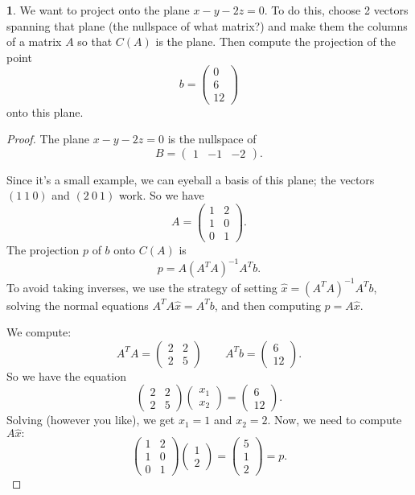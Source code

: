\documentclass{article}
\theoremstyle{definition}
\newtheorem{prob}{}
\begin{document}
\begin{prob}
	We want to project onto the plane $x-y-2z=0$. To do this, choose 2 vectors spanning that plane (the nullspace of what matrix?) and make them the columns of a matrix $A$ so that $C(A)$ is the plane. Then compute the projection of the point 
	\[b=\begin{pmatrix}
		0\\6\\12
	\end{pmatrix}\]
onto this plane.
\end{prob}
\begin{proof}
	The plane $x-y-2z=0$ is the nullspace of 
	\[B=\begin{pmatrix}
		1 & -1 & -2
	\end{pmatrix}.\]

Since it's a small example, we can eyeball a basis of this plane; the vectors $(1 \ 1 \ 0)$ and $(2\ 0\ 1)$ work. So we have 
\[A=\begin{pmatrix}
	1 & 2\\
	1 & 0\\
	0 & 1
\end{pmatrix}.\]
The projection $p$ of $b$ onto $C(A)$ is 
\[p=A(A^TA)^{-1}A^Tb.\]
To avoid taking inverses, we use the strategy of setting $\hat{x}=(A^TA)^{-1}A^Tb$, solving the normal equations $A^T A \hat{x}= A^T b$, and then computing $p = A \hat{x}$.

We compute: 
\[A^T A= \begin{pmatrix}
	2 & 2\\
	2 & 5
\end{pmatrix} 
\qquad
A^T b= \begin{pmatrix}
	6\\12
\end{pmatrix}.\]
So we have the equation 
\[\begin{pmatrix}
	2 & 2\\
	2 & 5
\end{pmatrix} \begin{pmatrix}
x_1\\x_2
\end{pmatrix}=\begin{pmatrix}
6\\12
\end{pmatrix}.\]
Solving (however you like), we get $x_1=1$ and $x_2=2$. Now, we need to compute $A \hat{x}:$
\[\begin{pmatrix}
	1 & 2\\
	1 & 0\\
	0 & 1
\end{pmatrix} \begin{pmatrix}
1\\2
\end{pmatrix}=\begin{pmatrix}
5 \\ 1\\2
\end{pmatrix}= p.\]


\end{proof}
\end{document}
